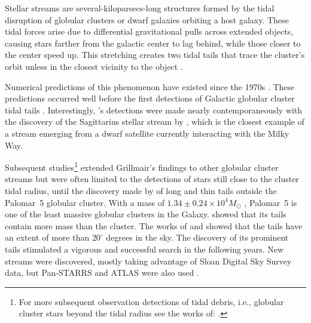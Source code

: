   Stellar streams are several-kiloparsecs-long structures formed by the tidal disruption of globular clusters or dwarf galaxies orbiting a host galaxy. These tidal forces arise due to differential gravitational pulls across extended objects, causing stars farther from the galactic center to lag behind, while those closer to the center speed up. This stretching creates two tidal tails that trace the cluster's orbit unless in the closest vicinity to the object \citep{2007ApJ...659.1212M}. 
  
  Numerical predictions of this phenomenon have existed since the 1970s \citep[see, e.g.,][]{1975AJ.....80..290K}. These predictions occurred well before the first detections of Galactic globular cluster tidal tails \citep{1995AJ....109.2553G}. Interestingly, \citet{1995AJ....109.2553G}'s detections were made nearly contemporaneously with the discovery of the Sagittarius stellar stream by \citet{1994Natur.370..194I}, which is the closest example of a stream emerging from a dwarf satellite currently interacting with the Milky Way. 
  
  Subsequent studies\footnote{For more subsequent observation detections of tidal debris, i.e., globular cluster stars beyond the tidal radius see the works of: \citet{1997A&A...320..776L, 2000A&A...356..127T, 2000A&A...359..907L, 2001AAS...19910906S, 2003AJ....126..815L,2011ApJ...726...47S,2018MNRAS.476.4814S,2020MNRAS.495.2222S}.} extended Grillmair's findings to other globular cluster streams but were often limited to the detections of stars still close to the cluster tidal radius, until the discovery made by \citet{2001ApJ...548L.165O,2002AAS...200.1001O, 2003AJ....126.2385O} of long and thin tails outside the Palomar~5 globular cluster. With a mass of $1.34\pm 0.24 \times 10^4 M_{\odot}$ \citep{2019MNRAS.482.5138B}, Palomar~5 is one of the least massive globular clusters in the Galaxy. \citet{2003AJ....126.2385O} showed that its tails contain more mass than the cluster. The works of \citet{2006ApJ...641L..37G} and \citet{2015MNRAS.446.3297K} showed that the tails have an extent of more than $20^\circ$ degrees in the sky. The discovery of its prominent tails stimulated a vigorous and successful search in the following years. New streams were discovered, mostly taking advantage of Sloan Digital Sky Survey data, but Pan-STARRS and ATLAS were also used \citep{2006ApJ...643L..17G, 2006ApJ...637L..29B, 2009ApJ...693.1118G, 2012ApJ...760L...6B, 2013ApJ...769L..23G, 2014ApJ...790L..10G, 2015ApJ...812L..26G, 2014MNRAS.443L..84B, 2016MNRAS.463.1759B, 2017ApJ...847..119G, 2014MNRAS.442L..85K}. 
  
